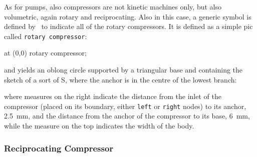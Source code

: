 \documentclass[12pt]{article}						%
\newcommand*{\ac}[1]{%
		\textsmaller{#1}%
	}
\newcommand*{\chpn}[1]{\texttt{#1}}				%
\newcommand*{\chpp}[1]{\texttt{#1}}				%
\newcommand*{\UNICHIM}{\ac{UNICHIM}}
\begin{document}
As for pumps, also compressors are not kinetic machines only, but also
volumetric, again rotary and reciprocating. Also in this case, a generic symbol
is defined by \UNICHIM\ to indicate all of the rotary compressors. It is defined
as a simple pic called \chpp{rotary compressor}:
\begin{chpcode}
	\pic at (0,0) {rotary compressor};
\end{chpcode}
and yields an oblong circle supported by a triangular base and containing the
sketch of a sort of S, where the anchor is in the centre of the lowest branch:
\begin{center}
\end{center}
where measures on the right indicate the distance from the inlet of the
compressor (placed on its boundary, either \chpn{left} or \chpn{right} nodes)
to its anchor, \SI{2.5}{\mm}, and the distance from the anchor of the
compressor to its base, \SI{6}{\mm}, while the measure on the top indicates the
width of the body.

\subsubsection{Reciprocating Compressor}
\end{document}
